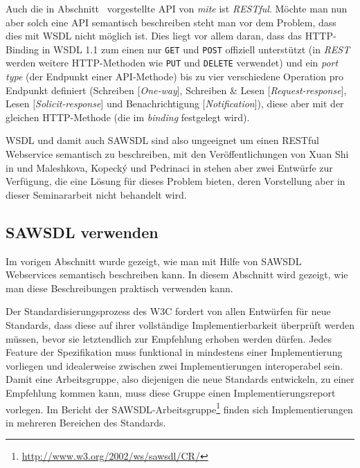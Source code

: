 Auch die in Abschnitt~\pageref{l:einleitung} vorgestellte API von \emph{mite} ist \emph{RESTful}. Möchte man nun aber solch eine API semantisch beschreiben steht man vor dem Problem, dass dies mit \ac{WSDL} nicht möglich ist. Dies liegt vor allem daran, dass das HTTP-Binding in \ac{WSDL} 1.1 zum einen nur \texttt{GET} und \texttt{POST} offiziell unterstützt (in \emph{REST} werden weitere HTTP-Methoden wie \texttt{PUT} und \texttt{DELETE} verwendet) und ein \emph{port type} (der Endpunkt einer API-Methode) bis zu vier verschiedene Operation pro Endpunkt definiert (Schreiben [\emph{One-way}], Schreiben \& Lesen [\emph{Request-response}], Lesen [\emph{Solicit-response}] und Benachrichtigung [\emph{Notification}]), diese aber mit der gleichen HTTP-Methode (die im \emph{binding} festgelegt wird).

\ac{WSDL} und damit auch \ac{SAWSDL} sind also ungeeignet um einen RESTful Webservice semantisch zu beschreiben, mit den Veröffentlichungen von Xuan Shi in \cite{xn-sss} und Maleshkova, Kopeck\'{y} und Pedrinaci in \cite{ma-sawslrest} stehen aber zwei Entwürfe zur Verfügung, die eine Lösung für dieses Problem bieten, deren Vorstellung aber in dieser Seminararbeit nicht behandelt wird.

\subsection{\acs{SAWSDL} verwenden}

Im vorigen Abschnitt wurde gezeigt, wie man mit Hilfe von \ac{SAWSDL} Webservices semantisch beschreiben kann. In diesem Abschnitt wird gezeigt, wie man diese Beschreibungen praktisch verwenden kann.

\bigskip

Der Standardisierungsprozess des \ac{W3C} fordert von allen Entwürfen für neue Standards, dass diese auf ihrer vollständige Implementierbarkeit überprüft werden müssen, bevor sie letztendlich zur Empfehlung erhoben werden dürfen. Jedes Feature der Spezifikation muss funktional in mindestens einer Implementierung vorliegen und idealerweise zwischen zwei Implementierungen interoperabel sein. Damit eine Arbeitsgruppe, also diejenigen die neue Standards entwickeln, zu einer Empfehlung kommen kann, muss diese Gruppe einen Implementierungsreport vorlegen. Im Bericht der \ac{SAWSDL}-Arbeitsgruppe\footnote{\url{http://www.w3.org/2002/ws/sawsdl/CR/}} finden sich Implementierungen in mehreren Bereichen des Standards.

